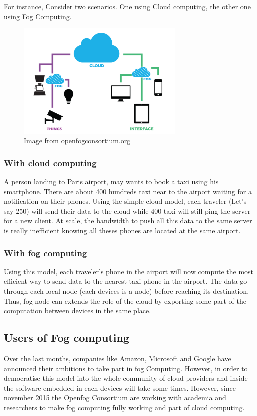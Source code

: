For instance, Consider two scenarios. One using Cloud computing, the other one using Fog Computing.

\begin{figure}[H]
  \centering
  \includegraphics[width=8cm]{body/fog.png}
  \caption{Image from openfogconsortium.org}
\end{figure}


\subsubsection{With cloud computing}

A person landing to Paris airport, may wants to book a taxi using his smartphone. There are about 400 hundreds taxi near to the airport waiting for a notification on their phones. Using the simple cloud model, each traveler (Let’s say 250) will send their data to the cloud while  400 taxi will still ping the server for a new client. At scale, the bandwidth to push all this data to the same server is really inefficient knowing all theses phones are located at the same airport.
\subsubsection{With fog computing}

Using this model, each traveler’s phone in the airport will now compute the most efficient way to send data to the nearest taxi phone in the airport. The data go through each local node (each devices is a node) before reaching its destination. Thus, fog node can extends the role of the cloud by exporting some part of the computation between devices in the same place.

\subsection{Users of Fog computing}

Over the last months, companies  like Amazon, Microsoft and Google have announced their ambitions to take part in fog Computing. However, in order to democratise this model into the whole community of cloud providers and   inside the software embedded in each devices will take some times. However, since november 2015 the Openfog Consortium are working with academia and researchers to make fog computing fully working and part of cloud computing.


